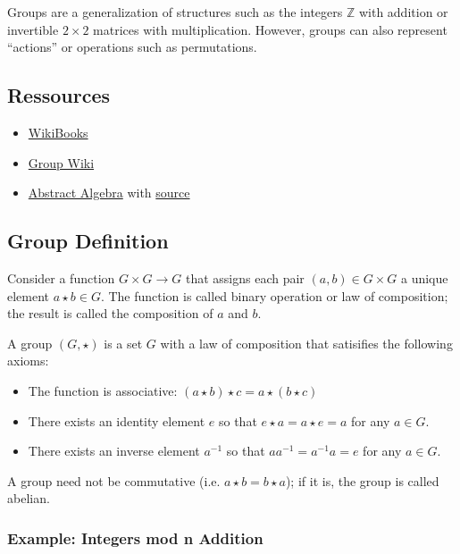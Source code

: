 

Groups are a generalization of structures such as the integers
\(\mathbb{Z}\) with addition or invertible \(2 \times 2\) matrices with
multiplication. However, groups can also represent ``actions'' or
operations such as permutations.

\subsection{Ressources}

\begin{itemize}

\item
  \href{https://en.wikibooks.org/wiki/Abstract_Algebra}{WikiBooks}
\item
  \href{http://groupprops.subwiki.org/wiki/Main_Page}{Group Wiki}
\item
  \href{http://abstract.ups.edu/download.html}{Abstract Algebra} with
  \href{https://github.com/twjudson/aata}{source}
\end{itemize}

\subsection{Group Definition}

Consider a function \(G \times G \rightarrow G\) that assigns each pair
\((a,b) \in G \times G\) a unique element \(a \star b \in G\). The
function is called binary operation or law of composition; the result is
called the composition of \(a\) and \(b\).

A group \((G, \star)\) is a set \(G\) with a law of composition that
satisifies the following axioms:

\begin{itemize}
\item
  The function is associative:
  \((a \star b) \star c = a \star (b \star c)\)
\item
  There exists an identity element \(e\) so that
  \(e \star a = a \star e = a\) for any \(a \in G\).
\item
  There exists an inverse element \(a^{-1}\) so that
  \(a a^{-1} = a^{-1} a = e\) for any \(a \in G\).
\end{itemize}

A group need not be commutative (i.e. \(a \star b = b \star a\)); if it
is, the group is called abelian.

\subsubsection{Example: Integers mod n
Addition}\label{example-integers-mod-n-addition}

